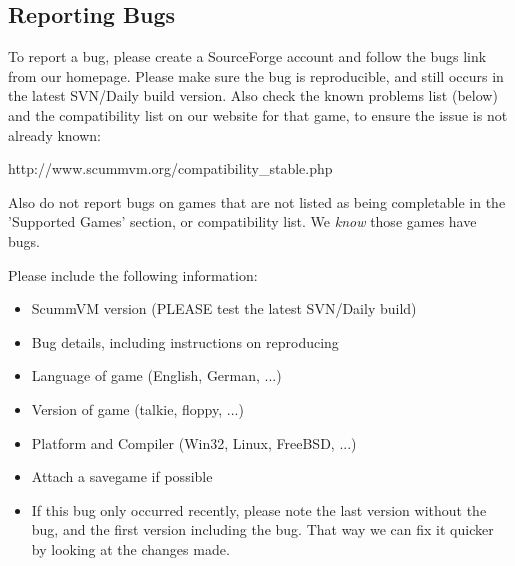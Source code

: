


\subsection{Reporting Bugs} \label{sect-reporting-bugs}

To report a bug, please create a SourceForge account and follow the bugs
link from our homepage. Please make sure the bug is reproducible, and
still occurs in the latest SVN/Daily build version. Also check the known
problems list (below) and the compatibility list on our website for that
game, to ensure the issue is not already known:

  http://www.scummvm.org/compatibility_stable.php

Also do not report bugs on games that are not listed as being completable
in the 'Supported Games' section, or compatibility list. We \textit{know} those
games have bugs.

Please include the following information:
\begin{itemize}
\item ScummVM version (PLEASE test the latest SVN/Daily build)
\item Bug details, including instructions on reproducing
\item Language of game (English, German, ...)
\item Version of game (talkie, floppy, ...)
\item Platform and Compiler (Win32, Linux, FreeBSD, ...)
\item Attach a savegame if possible
\item If this bug only occurred recently, please note the last
          version without the bug, and the first version including
          the bug. That way we can fix it quicker by looking at the
          changes made.
\end{itemize}
